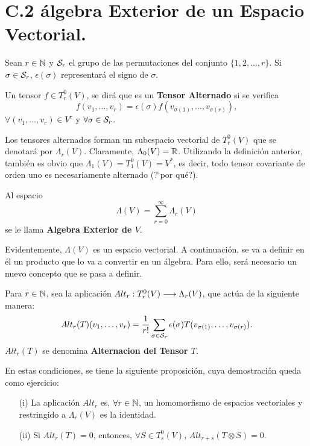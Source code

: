 \documentclass[cursovd_portada.tex]{subfiles}
\begin{document}
\section*{C.2 álgebra Exterior de un Espacio Vectorial.}
 \hs Sean $r\in\mathbb{N}$ y
${\cal S}_r$ el grupo de las permutaciones del conjunto $\{1,2,\dots ,r\}$. Si $\sigma\in{\cal S}_r$,
$\epsilon(\sigma)$ representará el signo de $\sigma$.
\begin{defiap}
Un tensor $f\in T^0_r(V)$, se dirá que es un {\bf Tensor Alternado} si se verifica
$$f(v_1,\dots ,v_r)=\epsilon(\sigma)f(v_{\sigma (1)},\dots ,v_{\sigma (r)}),$$
$\forall (v_1,\dots ,v_r)\in V^r$ y $\forall\sigma\in{\cal S}_r$.
\end{defiap}
\par\bigskip
Los tensores alternados forman un subespacio vectorial de $T^0_r(V)$ que se denotará por $\Lambda_r(V)$.
Claramente, $\Lambda _0(V)=\mathbb{R}$. Utilizando la definición anterior, también es obvio que $\Lambda
_1(V)=T^0_1(V)=V^*$, es decir, todo tensor covariante de orden uno es necesariamente alternado (?`por qué?).
\begin{defiap}
Al espacio
$$\Lambda (V)=\sum_{r=0}^\infty\Lambda_r(V)$$
se le llama {\bf Algebra Exterior de $V$}.
\end{defiap}
\par\bigskip
Evidentemente, $\Lambda (V)$ es un espacio vectorial. A continuación, se va a definir en él un producto que lo va
a convertir en un álgebra. Para ello, será necesario un nuevo concepto que se pasa a definir.
\begin{defiap}
Para $r\in\mathbb{N}$, sea la aplicación $Alt_r:T^0_r(V)\longrightarrow\Lambda _r(V)$, que actúa de la siguiente manera:
$$Alt_r(T)(v_1,\dots ,v_r)=\frac{1}{r!}\sum_{\sigma\in{\cal S}_r}\epsilon(
\sigma)T(v_{\sigma(1)},\dots ,v_{\sigma(r)}).$$ \hs $Alt_r(T)$ se denomina {\bf Alternacion del Tensor $T$}.
\end{defiap}
\par\bigskip
En estas condiciones, se tiene la siguiente proposición, cuya demostración queda como ejercicio:
\begin{propoap}
\begin{enumerate}
\item[(i)] La aplicación $Alt_r$ es, $\forall r\in\mathbb{N}$, un homomorfismo de
espacios vectoriales y restringido a $\Lambda_r(V)$ es la identidad.
\item[(ii)] Si $Alt_r(T)=0$, entonces, $\forall S\in T^0_s(V)$, $Alt_{r+s}(T
\otimes S)=0$.
\end{enumerate}
\end{propoap}
\end{document}
